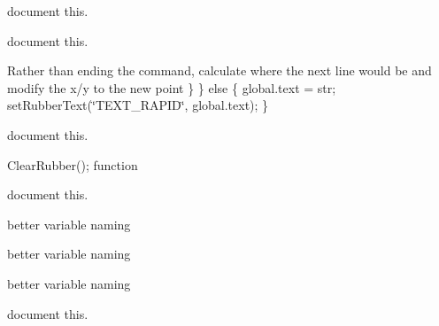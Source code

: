 \begin{DoxyRefList}
\label{todo__todo000098}%
%
document this. 
\item[Member \mbox{\hyperlink{imgui__main_8c_ae8fc4936b9433951a74c8f9bc667c246}{single\+\_\+line\+\_\+text\+\_\+main}} (void)]\label{todo__todo000220}%
%
document this.  
\item[Member \mbox{\hyperlink{imgui__main_8c_a9b5b21ae873aa1064eb16284d548fa11}{single\+\_\+line\+\_\+text\+\_\+prompt}} (Ui\+Object $\ast$global, const char $\ast$str)]\label{todo__todo000221}%
%
Rather than ending the command, calculate where the next line would be and modify the x/y to the new point \} \} else \{ global.\+text = str; set\+Rubber\+Text(\char`\"{}\+TEXT\+\_\+\+RAPID\char`\"{}, global.\+text); \}  
\item[Member \mbox{\hyperlink{imgui__main_8c_a5307d28a0ab917195f11a89a0dd1e265}{snowflake\+\_\+main}} ()]\label{todo__todo000222}%
%
document this.  
\item[Member \mbox{\hyperlink{imgui__main_8c_a2bace01becf7a93818045d13d18863db}{spare\+\_\+rubber\+\_\+action}} (void)]\label{todo__todo000141}%
%
Clear\+Rubber(); function  
\item[Member \mbox{\hyperlink{imgui__main_8c_a33a7499d857fd607ce2627e8c02dbc9c}{stub\+\_\+testing\+\_\+action}} (void)]\label{todo__todo000163}%
%
document this.  
\item[Member \mbox{\hyperlink{struct_sub_descriptor___affb2c75b7f632338f368aafab49f678d}{Sub\+Descriptor\+\_\+\+::color\+Code}} ]\label{todo__todo000396}%
%
better variable naming  
\item[Member \mbox{\hyperlink{struct_sub_descriptor___a0cfe04519ff6dab092ee7c002e55e520}{Sub\+Descriptor\+\_\+\+::some\+Int}} ]\label{todo__todo000394}%
%
better variable naming  
\item[Member \mbox{\hyperlink{struct_sub_descriptor___a6154b0f4ec7815c6d26c71852506418e}{Sub\+Descriptor\+\_\+\+::some\+Other\+Int}} ]\label{todo__todo000395}%
%
better variable naming  
\item[Member \mbox{\hyperlink{imgui__main_8c_af86b9a09f0e60cde3079b2007609e931}{text\+\_\+multi\+\_\+action}} (void)]\label{todo__todo000142}%
%
document this.  
\item[Member \mbox{\hyperlink{imgui__main_8c_ac78157cd935e95f0cbbe5924f7350230}{text\+\_\+single\+\_\+action}} (void)]\label{todo__todo000143}%

\end{DoxyRefList}
